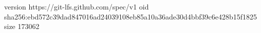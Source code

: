 version https://git-lfs.github.com/spec/v1
oid sha256:ebd572c39dad847016ad24039108eb85a10a36ade30d4bbf39c6e428b15f1825
size 173062

